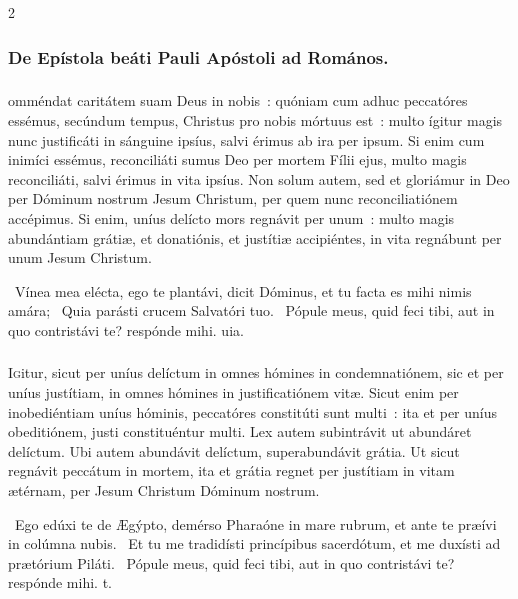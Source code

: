 \documentclass[9pt,twoside]{extarticle}
\begin{document}
\begin{multicols}{2}
{\subsubsection*{\center De Epístola beáti Pauli Apóstoli ad Romános.}
\subsubsection*{\center {}}
omméndat caritátem suam Deus in nobis~: quóniam cum adhuc peccatóres essémus, secúndum tempus, Christus pro nobis mórtuus est~: multo ígitur magis nunc justificáti in sánguine ipsíus, salvi érimus ab ira per ipsum. Si enim cum inimíci essémus, reconciliáti sumus Deo per mortem Fílii ejus, multo magis reconciliáti, salvi érimus in vita ipsíus. Non solum autem, sed et gloriámur in Deo per Dóminum nostrum Jesum Christum, per quem nunc reconciliatiónem accépimus. Si enim, uníus delícto mors regnávit per unum~: multo magis abundántiam grátiæ, et donatiónis, et justítiæ accipiéntes, in vita regnábunt per unum Jesum Christum.

\begin{tightlist}{}
\item {}~Vínea mea elécta, ego te plantávi, dicit Dóminus, et tu facta es mihi nimis amára; \textred{*}~Quia parásti crucem Salvatóri tuo. ~Pópule meus, quid feci tibi, aut in quo contristávi te? respónde mihi. uia.
\end{tightlist}

\subsubsection*{\center{}}
\lettrine{I}gitur, sicut per uníus delíctum in omnes hómines in condemnatiónem, sic et per uníus justítiam, in omnes hómines in justificatiónem vitæ. Sicut enim per inobediéntiam uníus hóminis, peccatóres constitúti sunt multi~: ita et per uníus obeditiónem, justi constituéntur multi. Lex autem subintrávit ut abundáret delíctum. Ubi autem abundávit delíctum, superabundávit grátia. Ut sicut regnávit peccátum in mortem, ita et grátia regnet per justítiam in vitam ætérnam, per Jesum Christum Dóminum nostrum.

\begin{tightlist}{}
\item {}~Ego edúxi te de Ægýpto, demérso Pharaóne in mare rubrum, et ante te præívi in colúmna nubis. \textred{*}~Et tu me tradidísti princípibus sacerdótum, et me duxísti ad prætórium Piláti. ~Pópule meus, quid feci tibi, aut in quo contristávi te? respónde mihi. t.
\end{tightlist}

}
\end{multicols}
\end{document}
